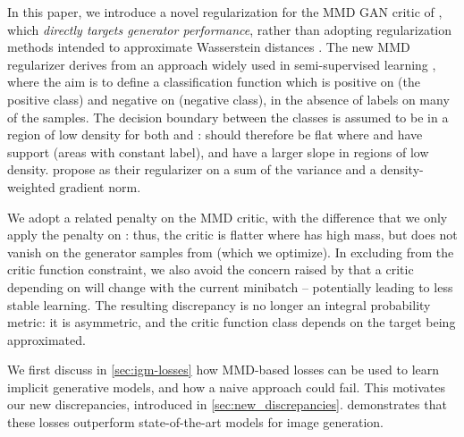 \documentclass{article}
\let\citep\parencite
\begin{document}
In this paper, we introduce a novel regularization
for the MMD GAN critic of \citep{cramer-gan,mmd-gan,Binkowski:2018},
which {\em directly targets generator performance},
rather than
adopting regularization methods intended to approximate Wasserstein distances \cite{wgan,wgan-gp}.
The new MMD regularizer derives from an approach widely used in semi-supervised
learning \parencite[][Section 2]{Bousquet:2004}, where the aim is to
define a classification function  which is positive on 
(the positive class) and negative on  (negative class),
in the absence of labels on many of the samples.
The decision boundary between the classes is assumed to be in a region
of low density for both  and :  should therefore
be flat where  and  have support (areas with
constant label), and have a larger slope in regions of low density.
\Textcite{Bousquet:2004} propose as their regularizer on  a sum of the
variance and a density-weighted gradient norm.

We adopt a related penalty on the MMD critic,
with the difference that we only apply the penalty on :
thus, the critic is flatter where  has high mass,
but does not vanish on the generator samples from  (which we optimize).
In excluding  from the critic function constraint,
we also avoid the concern raised by \citep{Miyato:2018}
that a critic depending on  will change with the current minibatch --
potentially leading to less stable learning.
The resulting discrepancy is no longer an integral probability metric:
it is asymmetric,
and the critic function class depends on the target  being approximated.

We first discuss in \cref{sec:igm-losses} how MMD-based losses can be used to learn implicit generative models, and how a naive approach could fail.
This motivates our new discrepancies, introduced in \cref{sec:new_discrepancies}.
 demonstrates that these losses outperform state-of-the-art models for image generation.
\end{document}
